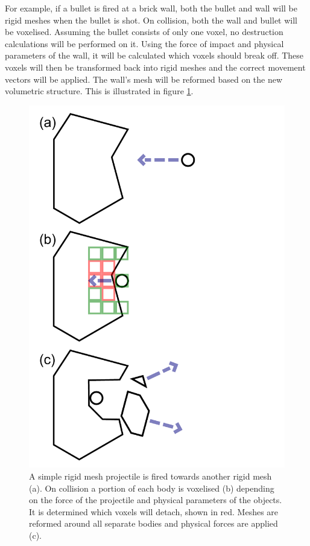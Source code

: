 For example, if a bullet is fired at a brick wall, both the bullet and wall will be rigid meshes when the bullet is shot. On collision, both the wall and bullet will be voxelised. Assuming the bullet consists of only one voxel, no destruction calculations will be performed on it. Using the force of impact and physical parameters of the wall, it will be calculated which voxels should break off. These voxels will then be transformed back into rigid meshes and the correct movement vectors will be applied. The wall's mesh will be reformed based on the new volumetric structure. This is illustrated in figure \ref{fig}.

\begin{figure}

\label{fig}
\centerline{\includegraphics[scale=0.5]{diagram.pdf}}
\caption{A simple rigid mesh projectile is fired towards another rigid mesh (a). On collision a portion of each body is voxelised (b) depending on the force of the projectile and physical parameters of the objects. It is determined which voxels will detach, shown in red. Meshes are reformed around all separate bodies and physical forces are applied (c).}
\end{figure}

